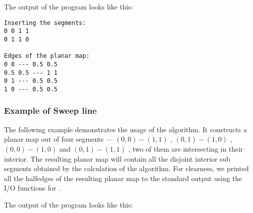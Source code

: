
The output of the program looks like this:
\begin{verbatim}
Inserting the segments:
0 0 1 1
0 1 1 0

Edges of the planar map:
0 0 --- 0.5 0.5
0.5 0.5 --- 1 1
0 1 --- 0.5 0.5
1 0 --- 0.5 0.5
\end{verbatim}


\subsubsection{Example of Sweep line}
\label{ssec:example1}
The following example demonstrates the usage of the  algorithm.
It constructs a planar map out of four segments --- $(0,0)-(1,1)$ , $(0,1)-(1,0)$ , 
$(0,0)-(1,0)$ and $(0,1)-(1,1)$ , two of them are intersecting in their interior.
The resulting planar map will contain all the disjoint interior sub segments obtained 
by the calculation of the  algorithm. For clearness, we printed all the 
halfedges of the resulting planar map to the standard output using the I/O functions for .


The output of the program looks like this:




